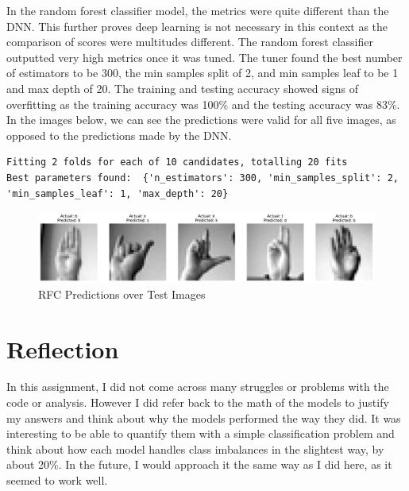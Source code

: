 \documentclass[
  letterpaper,
  DIV=11,
  numbers=noendperiod]{scrartcl}
\begin{document}
In the random forest classifier model, the metrics were quite different
than the DNN. This further proves deep learning is not necessary in this
context as the comparison of scores were multitudes different. The
random forest classifier outputted very high metrics once it was tuned.
The tuner found the best number of estimators to be 300, the min samples
split of 2, and min samples leaf to be 1 and max depth of 20. The
training and testing accuracy showed signs of overfitting as the
training accuracy was 100\% and the testing accuracy was 83\%. In the
images below, we can see the predictions were valid for all five images,
as opposed to the predictions made by the DNN.

\begin{verbatim}
Fitting 2 folds for each of 10 candidates, totalling 20 fits
Best parameters found:  {'n_estimators': 300, 'min_samples_split': 2, 'min_samples_leaf': 1, 'max_depth': 20}
\end{verbatim}

\begin{figure}

{\centering \includegraphics{HW2_Reflection_files/figure-pdf/model_output_rfc_images-output-2.pdf}

}

\caption{RFC Predictions over Test Images}

\end{figure}%

\section{Reflection}\label{reflection}

In this assignment, I did not come across many struggles or problems
with the code or analysis. However I did refer back to the math of the
models to justify my answers and think about why the models performed
the way they did. It was interesting to be able to quantify them with a
simple classification problem and think about how each model handles
class imbalances in the slightest way, by about 20\%. In the future, I
would approach it the same way as I did here, as it seemed to work well.
\end{document}
